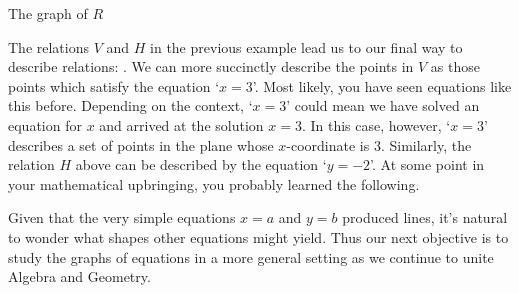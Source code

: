 {\begin{enumerate}

\noindent\begin{minipage}{\textwidth}
\begin{center}
\end{center}
\captionsetup{type=figure}
\caption{The graph of $R$}
\end{minipage}

\end{enumerate}
}

\medskip

The relations $V$ and $H$ in the previous example lead us to our final way to describe relations:   .  We can more succinctly describe the points in $V$ as those points which satisfy the equation `$x = 3$'.  Most likely, you have seen equations like this before.  Depending on the context, `$x = 3$' could mean we have solved an equation for $x$ and arrived at the solution $x=3$. In this case, however, `$x = 3$' describes a set of points in the plane whose $x$-coordinate is $3$.  Similarly, the relation $H$ above can be described by the equation `$y = -2$'.  At some point in your mathematical upbringing, you probably learned the following.

\smallskip


\smallskip

Given that the very simple equations $x = a$ and $y = b$ produced lines, it's natural to wonder what shapes other equations might yield.  Thus our next objective is to study the graphs of equations in a more general setting as we continue to unite Algebra and Geometry.

